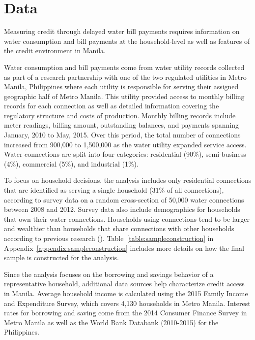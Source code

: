 \documentclass[12pt]{article}
\begin{document}
\section{Data}\label{section:data}


Measuring credit through delayed water bill payments requires information on water consumption and bill payments at the household-level as well as features of the credit environment in Manila.  %

Water consumption and bill payments come from water utility records collected as part of a research partnership with one of the two regulated utilities in Metro Manila, Philippines where each utility is responsible for serving their assigned geographic half of Metro Manila.  This utility provided access to monthly billing records for each connection as well as detailed information covering the regulatory structure and costs of production.  Monthly billing records include meter readings, billing amount, outstanding balances, and payments spanning January, 2010 to May, 2015.  Over this period, the total number of connections increased from 900,000 to 1,500,000 as the water utility expanded service access.  Water connections are split into four categories: residential (90\%), semi-business (4\%), commercial (5\%), and industrial (1\%).  

To focus on household decisions, the analysis includes only residential connections that are identified as serving a single household (31\% of all connections), according to survey data on a random cross-section of 50,000 water connections between 2008 and 2012.  Survey data also include demographics for households that own their water connections.  Households using connections tend to be larger and wealthier than households that share connections with other households according to previous research (\cite{wjv}).  Table~\ref{table:sampleconstruction} in Appendix~\ref{appendix:sampleconstruction} includes more details on how the final sample is constructed for the analysis.

Since the analysis focuses on the borrowing and savings behavior of a representative household, additional data sources help characterize credit access in Manila.  Average household income is calculated using the  2015 Family Income and Expenditure Survey, which covers 4,130 households in Metro Manila.  Interest rates for borrowing and saving come from the 2014 Consumer Finance Survey in Metro Manila as well as the World Bank Databank (2010-2015) for the Philippines.  
\end{document}
